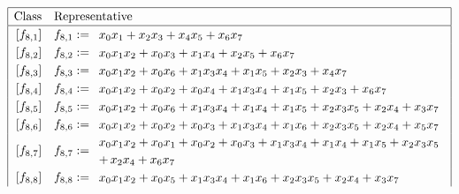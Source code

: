 \documentclass[12pt,a4paper]{article}
\begin{document}
\begin{table}[!bhpt] %
\small{}
\begin{align*}
\def\arraystretch{1.2}
\begin{array}{|cl|}
\hline
\text{Class} &
\text{Representative}
\\
\hline
\,[f_{ 8 , 1 }] & f_{ 8 , 1 } :=
\begin{array}{l}
x_{0} x_{1} + x_{2} x_{3} + x_{4} x_{5} + x_{6} x_{7}
\end{array}
\\
\,[f_{ 8 , 2 }] & f_{ 8 , 2 } :=
\begin{array}{l}
x_{0} x_{1} x_{2} + x_{0} x_{3} + x_{1} x_{4} + x_{2} x_{5} + x_{6} x_{7}
\end{array}
\\
\,[f_{ 8 , 3 }] & f_{ 8 , 3 } :=
\begin{array}{l}
x_{0} x_{1} x_{2} + x_{0} x_{6} + x_{1} x_{3} x_{4} + x_{1} x_{5} + x_{2} x_{3} + x_{4} x_{7}
\end{array}
\\
\,[f_{ 8 , 4 }] & f_{ 8 , 4 } :=
\begin{array}{l}
x_{0} x_{1} x_{2} + x_{0} x_{2} + x_{0} x_{4} + x_{1} x_{3} x_{4} + x_{1} x_{5} + x_{2} x_{3} +
x_{6} x_{7}
\end{array}
\\
\,[f_{ 8 , 5 }] & f_{ 8 , 5 } :=
\begin{array}{l}
x_{0} x_{1} x_{2} + x_{0} x_{6} + x_{1} x_{3} x_{4} + x_{1} x_{4} + x_{1} x_{5} + x_{2} x_{3} x_{5}
+ x_{2} x_{4} + x_{3} x_{7}
\end{array}
\\
\,[f_{ 8 , 6 }] & f_{ 8 , 6 } :=
\begin{array}{l}
x_{0} x_{1} x_{2} + x_{0} x_{2} + x_{0} x_{3} + x_{1} x_{3} x_{4} + x_{1} x_{6} + x_{2} x_{3} x_{5}
+ x_{2} x_{4} + x_{5} x_{7}
\end{array}
\\
\,[f_{ 8 , 7 }] & f_{ 8 , 7 } :=
\begin{array}{l}
x_{0} x_{1} x_{2} + x_{0} x_{1} + x_{0} x_{2} + x_{0} x_{3} + x_{1} x_{3} x_{4} + x_{1} x_{4} +
x_{1} x_{5} + x_{2} x_{3} x_{5}
\\
+\,  x_{2} x_{4} + x_{6} x_{7}
\end{array}
\\
\,[f_{ 8 , 8 }] & f_{ 8 , 8 } :=
\begin{array}{l}
x_{0} x_{1} x_{2} + x_{0} x_{5} + x_{1} x_{3} x_{4} + x_{1} x_{6} + x_{2} x_{3} x_{5} + x_{2} x_{4}
+ x_{3} x_{7}
\end{array}

\end{array}
\end{align*}
\end{table}
\end{document}
